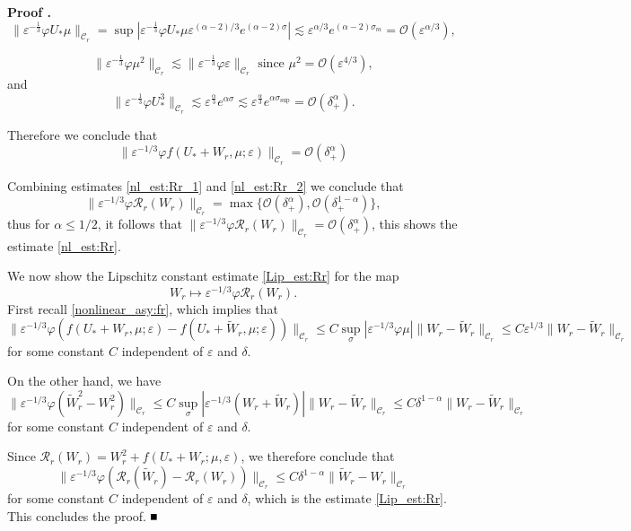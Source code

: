 \documentclass[letterpaper,11pt]{article}
\newcommand{\rmO}{\mathcal{O}}
\newcommand{\eps}{\varepsilon}
\newcommand{\lar}{ \lesssim }
\newcommand{\Ral}{\mathcal{R}}
\numberwithin{equation}{section}
\theoremstyle{plain}
\newenvironment{Proof}[1][\unskip]%
 {\begin{trivlist} \item[]{\bf Proof #1. }}%
 {\hspace*{\fill}$\rule{.4\baselineskip}{.4\baselineskip}$\end{trivlist}}
\begin{document}
\begin{Proof}
\[
\|\eps^{-\frac{1}{3}}\varphi U_*\mu \|_{\mathcal{C}_r} =\sup |\eps^{-\frac{1}{3}} \varphi  U_*\mu  \eps^{(\alpha-2)/3}e^{(\alpha-2)\sigma} | \lar \eps^{\alpha/3} e^{(\alpha-2)\sigma_m}  =\rmO( \eps^{\alpha/3}) ,
\]

\[
\|\eps^{-\frac{1}{3}}\varphi \mu^2 \|_{\mathcal{C}_r} \lar \|\eps^{-\frac{1}{3}}\varphi \eps \|_{\mathcal{C}_r} \text{ since } \mu^2 = \rmO(\eps^{4/3}), 
\]
and
\[
\|\eps^{-\frac{1}{3}}\varphi U_*^3\|_{\mathcal{C}_r} \lar \eps^{\frac{\alpha}{3}} e^{\alpha\sigma} \lar \eps^{\frac{\alpha}{3}} e^{\alpha\sigma_{\sup}} = \rmO(\delta_+^\alpha).
\]

Therefore we conclude that
\begin{equation}\label{nl_est:Rr_2}
\|\eps^{-1/3}\varphi f(U_*+W_r, \mu ;\eps)\|_{\mathcal{C}_r} = \rmO(\delta^{\alpha}_+)
\end{equation}

Combining estimates \eqref{nl_est:Rr_1} and \eqref{nl_est:Rr_2} we conclude that 
\[
\|\eps^{-1/3}\varphi \Ral_r(W_r) \|_{\mathcal{C}_r} = \max\{ \rmO(\delta_+^\alpha), \rmO(\delta_+^{1-\alpha})\},
\]
thus for $\alpha \le 1/2$, it follows that $\|\eps^{-1/3}\varphi \Ral_r(W_r) \|_{\mathcal{C}_r} = \rmO(\delta_+^\alpha)$, this shows the estimate \eqref{nl_est:Rr}.

We now show the Lipschitz constant estimate \eqref{Lip_est:Rr} for the map
\[ 
W_r \mapsto \eps^{-1/3}\varphi \mathcal{R}_r(W_r).
\] 
First recall \eqref{nonlinear_asy:fr}, which implies that 
\[
\|\eps^{-1/3}\varphi(f(U_*+W_r,\mu;\eps)-f(U_*+\widetilde{W}_r,\mu;\eps))\|_{\mathcal{C}_r} \le C\sup_{\sigma}|\eps^{-1/3}\varphi\mu|\|W_r- \widetilde{W}_r\|_{\mathcal{C}_r} \le C\eps^{1/3}\|W_r- \widetilde{W}_r \|_{\mathcal{C}_r}
\]
for some constant $C$ independent of $\eps$ and $\delta$.

On the other hand, we have
\[
\|\eps^{-1/3}\varphi(\widetilde{W}_r^2-W_r^2 )\|_{\mathcal{C}_r} \le C\sup_{\sigma}|\eps^{-1/3}(W_r+\tilde{W}_r)|\|W_r- \widetilde{W}_r\|_{\mathcal{C}_r} \le C\delta^{1-\alpha}\|W_r- \widetilde{W}_r \|_{\mathcal{C}_r}
\]
for some constant $C$ independent of $\eps$ and $\delta$.

Since $\mathcal{R}_r(W_r) = W_r^2 + f(U_*+W_r;\mu,\eps)$, we therefore conclude that
\[
\|\eps^{-1/3}\varphi(\mathcal{R}_r(\widetilde{W}_r) - \mathcal{R}_r(W_r)) \|_{\mathcal{C}_r}\le C\delta^{1-\alpha} \|\widetilde{W}_r - W_r \|_{\mathcal{C}_r}
\]
for some constant $C$ independent of $\eps$ and $\delta$, which is the estimate \eqref{Lip_est:Rr}. This concludes the proof.
\end{Proof}
\end{document}
